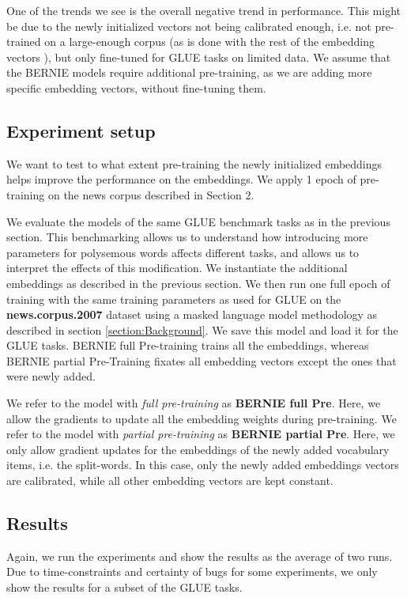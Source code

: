 \documentclass[a4paper,12pt,twoside,openright]{report}
\begin{document}
One of the trends we see is the overall negative trend in performance.
This might be due to the newly initialized vectors not being calibrated enough, i.e. not pre-trained on a large-enough corpus (as is done with the rest of the embedding vectors \cite{devlin18}), but only fine-tuned for GLUE tasks on limited data.
We assume that the BERNIE models require additional pre-training, as we are adding more specific embedding vectors, without fine-tuning them.

\subsection{Experiment setup}

We want to test to what extent pre-training the newly initialized embeddings helps improve the performance on the embeddings.
We apply 1 epoch of pre-training on the news corpus described in Section 2.

We evaluate the models of the same GLUE benchmark tasks as in the previous section.
This benchmarking allows us to understand how introducing more parameters for polysemous words affects different tasks, and allows us to interpret the effects of this modification.
We instantiate the additional embeddings as described in the previous section.
We then run one full epoch of training with the same training parameters as used for GLUE on the \textbf{news.corpus.2007} dataset using a masked language model methodology as described in section \ref{section:Background}.
We save this model and load it for the GLUE tasks.
BERNIE full Pre-training trains all the embeddings, whereas BERNIE partial Pre-Training fixates all embedding vectors except the ones that were newly added.

We refer to the model with \textit{full pre-training} as \textbf{BERNIE full Pre}.
Here, we allow the gradients to update all the embedding weights during pre-training.
We refer to the model with \textit{partial pre-training} as \textbf{BERNIE partial Pre}.
Here, we only allow gradient updates for the embeddings of the newly added vocabulary items, i.e. the split-words.
In this case, only the newly added embeddings vectors are calibrated, while all other embedding vectors are kept constant.


\subsection{Results}

Again, we run the experiments and show the results as the average of two runs.
Due to time-constraints and certainty of bugs for some experiments, we only show the results for a subset of the GLUE tasks.
\end{document}
